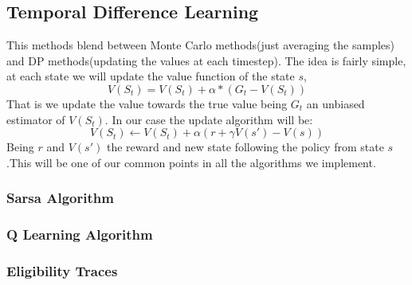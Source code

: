 \documentclass{article}
\begin{document}
\subsection{Temporal Difference Learning}
This methods blend between Monte Carlo methods(just averaging the samples) and DP methods(updating the values at each timestep). The idea is fairly simple, at each state we will update the value function of the state $s$, $$V(S_{t}) = V(S_{t}) + \alpha * (G_{t} - V(S_{t}))$$That is we update the value towards the true value being $G_{t}$ an unbiased estimator of $V(S_{t})$. In our case the update algorithm will be:\newline
$$V(S_{t}) \leftarrow V(S_{t}) + \alpha (r + \gamma V(s') - V(s))$$ Being $r$ and $V(s')$ the reward and new state following the policy from state $s$.This will be one of our common points in all the algorithms we implement.\newline
\subsubsection{Sarsa Algorithm}
\subsubsection{Q Learning Algorithm}
\subsubsection{Eligibility Traces}
\end{document}
